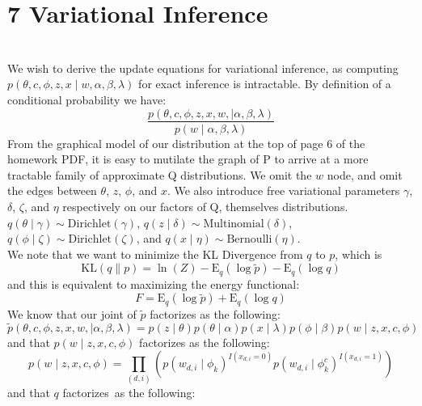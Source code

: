 \documentclass[12pt]{article}
\begin{document}
\section*{7 Variational Inference}
\\
We wish to derive the update equations for variational inference, as computing $p(\theta, c, \phi, z, x \mid w, \alpha, \beta, \lambda)$ for exact inference is intractable.  By definition of a conditional probability we have:
\begin{equation*}
\frac{p(\theta, c, \phi, z, x, w, \mid \alpha, \beta, \lambda)}{p(w \mid \alpha, \beta, \lambda)}
\end{equation*}
From the graphical model of our distribution at the top of page 6 of the homework PDF, it is easy to mutilate the graph of P to arrive at a more tractable family of approximate Q distributions.  We omit the $w$ node, and omit the edges between $\theta$, $z$, $\phi$, and $x$.  We also introduce free variational parameters $\gamma$, $\delta$, $\zeta$, and $\eta$ respectively on our factors of Q, themselves distributions.  $q(\theta \mid \gamma) \sim \mathrm{Dirichlet}(\gamma)$, $q(z \mid \delta) \sim \mathrm{Multinomial}(\delta)$, $q(\phi \mid \zeta) \sim \mathrm{Dirichlet}(\zeta)$, and $q(x \mid \eta) \sim \mathrm{Bernoulli}(\eta)$.\\
We note that we want to minimize the KL Divergence from $q$ to $p$, which is
\begin{equation*}
\mathrm{KL}(q\|p) = \ln(Z) - \mathrm{E}_q (\log \widetilde{p}) - \mathrm{E}_q (\log q) 
\end{equation*}
and this is equivalent to maximizing the energy functional:
\begin{equation*}
F = \mathrm{E}_q (\log \widetilde{p}) + \mathrm{E}_q (\log q)
\end{equation*}
We know that our joint of $\widetilde{p}$ factorizes as the following:
\begin{equation*}
\widetilde{p}(\theta, c, \phi, z, x, w, \mid \alpha, \beta, \lambda) = p(z \mid \theta) p(\theta \mid \alpha) p(x \mid \lambda) p(\phi \mid \beta) p(w \mid z, x, c, \phi)
\end{equation*}
and that $p(w \mid z, x, c, \phi)$ factorizes as the following:
\begin{equation*}
p(w \mid z, x, c, \phi) = \prod_{(d,i)} ( p(w_{d,i} \mid \phi_k)^{I(x_{d,i} = 0)} p(w_{d,i} \mid \phi_{k}^{c})^{I(x_{d,i} = 1)} )
\end{equation*}
and that $q$ factorizes\ as the following:
\end{document}
